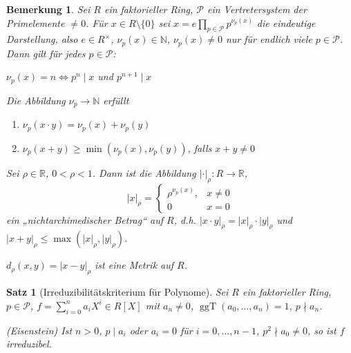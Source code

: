 \documentclass[a4paper,10pt,german]{scrbook}
\theoremstyle{saetze}
\newtheorem{Satz}{Satz}
\theoremstyle{definitionen}
\newtheorem{Bem}[Def]{Bemerkung}
\begin{document}
\begin{Bem}
\label{p-adische-bewertung}
Sei $R$ ein faktorieller Ring, $\mathcal P$ ein Vertretersystem der Primelemente $\ne 0$. Für $x\in R\setminus\{0\}$ sei $x=e\prod_{p\in\mathcal P}p^{\nu_p(x)}$ die eindeutige Darstellung, also $e\in R^\times$, $\nu_p(x)\in \mathbb N$, $\nu_p(x)\ne 0$ nur für endlich viele $p\in \mathcal P$. Dann gilt für jedes $p\in\mathcal P$:
\begin{enum}
\item $\nu_p(x)=n \iff p^n\mid x$ und $p^{n+1}\mid x$
\item Die Abbildung $\nu_{p}\to \mathbb N$ erfüllt
\begin{enumerate}
\item[(i)] $\nu_p(x\cdot y) = \nu_p(x) + \nu_p(y)$
\item[(ii)] $\nu_p(x+y) \ge \min(\nu_p(x), \nu_p(y))$, falls $x+y\ne 0$
\end{enumerate}
\item Sei $\rho\in \mathbb R$, $0<\rho<1$. Dann ist die Abbildung $|\cdot|_\rho:R\to \mathbb R$,
\[
|x|_\rho = 
\begin{cases}
\rho^{\nu_p(x)}, & x \ne 0\\
0 & x = 0
\end{cases}
\]
ein „nichtarchimedischer Betrag“ auf $R$, d.h. $|x\cdot y|_\rho = |x|_\rho \cdot |y|_\rho$ und $|x+y|_\rho \le \max(|x|_\rho, |y|_\rho)$.
\item $d_\rho(x,y) = |x-y|_\rho$ ist eine Metrik auf $R$.
\end{enum}
\end{Bem}


\begin{Satz}[Irreduzibilitätskriterium für Polynome]
Sei $R$ ein faktorieller Ring, $p\in \mathcal P$, $f = \sum_{i=0}^n a_i X^i \in R[X]$ mit $a_n \neq 0$, $\operatorname{ggT}(a_0,\ldots,a_n)=1$, $p\nmid a_n$.
\begin{enum}
\item (Eisenstein) Ist $n>0$, $p\mid a_i$ oder $a_i=0$ für $i=0,\ldots,n-1$, $p^2\nmid a_0\ne 0$, so ist $f$ irreduzibel.
\end{enum}
\end{Satz}

\end{document}
